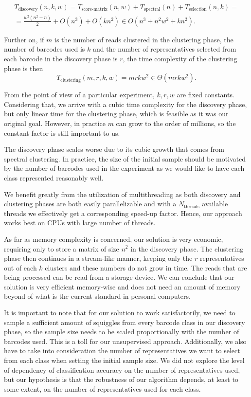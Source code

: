\begin{multline}
    T_{\text{discovery}}(n, k, w) = T_{\text{score-matrix}}(n, w) +  T_{\text{spectral}}(n) + T_{\text{selection}}(n, k) =\\= \frac{w^2(n^2 - n)}{2} + O(n^3) + O(kn^2) \in O(n^3 + n^2w^2 + kn^2).
\end{multline}

Further on, if $m$ is the number of reads clustered in the clustering phase, the number of barcodes used is $k$ and the number of representatives selected from each barcode in the discovery phase is $r$, the time complexity of the clustering phase is then
\begin{equation}
    T_{\text{clustering}}(m, r, k, w) = mrkw^2 \in \Theta(mrk w^2).
\end{equation}

From the point of view of a particular experiment, $k, r, w$ are fixed constants. Considering that, we arrive with a cubic time complexity for the discovery phase, but only linear time for the clustering phase, which is feasible as it was our original goal. However, in practice $m$ can grow to the order of millions, so the constant factor is still important to us.

The discovery phase scales worse due to its cubic growth that comes from spectral clustering. In practice, the size of the initial sample should be motivated by the number of barcodes used in the experiment as we would like to have each class represented reasonably well.

We benefit greatly from the utilization of multithreading as both discovery and clustering phases are both easily parallelizable and with a $N_{\text{threads}}$ available threads we effectively get a corresponding speed-up factor. Hence, our approach works best on CPUs with large number of threads.

As far as memory complexity is concerned, our solution is very economic, requiring only to store a matrix of size $n^2$ in the discovery phase. The clustering phase then continues in a stream-like manner, keeping only the $r$ representatives out of each $k$ clusters and these numbers do not grow in time. The reads that are being processed can be read from a storage device. We can conclude that our solution is very efficient memory-wise and does not need an amount of memory beyond of what is the current standard in personal computers.

It is important to note that for our solution to work satisfactorily, we need to sample a sufficient amount of squiggles from every barcode class in our discovery phase, so the sample size needs to be scaled proportionally with the number of barcodes used. This is a toll for our unsupervised approach. Additionally, we also have to take into consideration the number of representatives we want to select from each class when setting the initial sample size. We did not explore the level of dependency of classification accuracy on the number of representatives used, but our hypothesis is that the robustness of our algorithm depends, at least to some extent, on the number of representatives used for each class.

